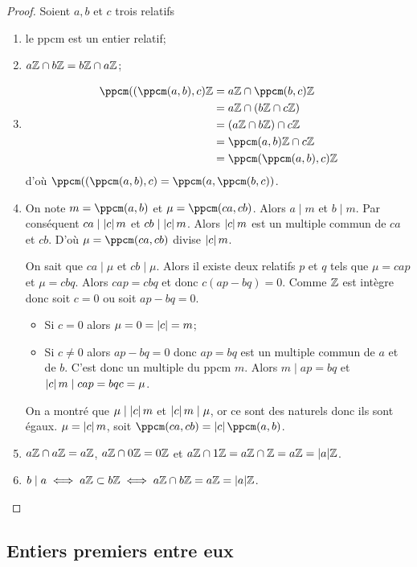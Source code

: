 \begin{proof}
  Soient $a,b$ et $c$ trois relatifs
  \begin{enumerate}
  \item le ppcm est un entier relatif;
  \item $a\mathbb{Z} \cap b\mathbb{Z} = b\mathbb{Z} \cap a\mathbb{Z}$;
  \item
    \begin{align}
      \ppcm((\ppcm(a,b),c) \Z &= a\Z \cap \ppcm(b,c) \Z \\ &= a\Z \cap (b\Z \cap c\Z)\\ &= (a\Z \cap b\Z) \cap c\Z \\ &= \ppcm(a,b) \Z \cap c\Z \\ &=\ppcm(\ppcm(a,b),c) \Z
    \end{align}
    d'où $\ppcm((\ppcm(a,b),c)=\ppcm(a,\ppcm(b,c))$.
  \item On note $m=\ppcm(a,b)$ et $\mu=\ppcm(ca,cb)$. Alors $a \mid m$ et $b \mid m$. Par conséquent $ca \mid \left\lvert c\right\rvert m$ et $cb \mid \left\lvert c\right\rvert m$. Alors $\left\lvert c\right\rvert m$ est un multiple commun de $ca$ et $cb$. D'où $\mu=\ppcm(ca,cb)$ divise $\left\lvert c\right\rvert m$.

    On sait que $ca \mid \mu$ et $cb \mid \mu$. Alors il existe deux relatifs $p$ et $q$ tels que $\mu = cap$ et $\mu=cbq$. Alors $cap=cbq$ et donc $c(ap-bq)=0$. Comme $\mathbb{Z}$ est intègre donc soit $c=0$ ou soit $ap-bq=0$.
    \begin{itemize}
    \item Si $c=0$ alors $\mu=0=\left\lvert c\right\rvert=m$;
    \item Si $c \neq 0$ alors $ap-bq=0$ donc $ap=bq$ est un multiple commun de $a$ et de $b$. C'est donc un multiple du ppcm $m$. Alors $m \mid ap=bq$ et $\left\lvert c\right\rvert m \mid cap = bqc=\mu$. 
    \end{itemize}
    On a montré que $\mu \mid \left\lvert c\right\rvert m$ et $\left\lvert c\right\rvert m \mid \mu$, or ce sont des naturels donc ils sont égaux. $\mu=\left\lvert c\right\rvert m$, soit $\ppcm(ca,cb)=\abs{c}\ppcm(a,b)$.
  \item $a\mathbb{Z} \cap a\mathbb{Z} = a\mathbb{Z}$, $a\mathbb{Z} \cap 0\mathbb{Z} = 0\mathbb{Z}$ et $a\mathbb{Z} \cap 1\mathbb{Z} = a\mathbb{Z} \cap \mathbb{Z}=a\mathbb{Z}=|a|\mathbb{Z}$.
  \item $b \mid a \iff a\mathbb{Z} \subset b\mathbb{Z} \iff a\mathbb{Z} \cap b\mathbb{Z} = a\mathbb{Z}=|a|\mathbb{Z}$.
  \end{enumerate}
\end{proof}

\subsection{Entiers premiers entre eux}

